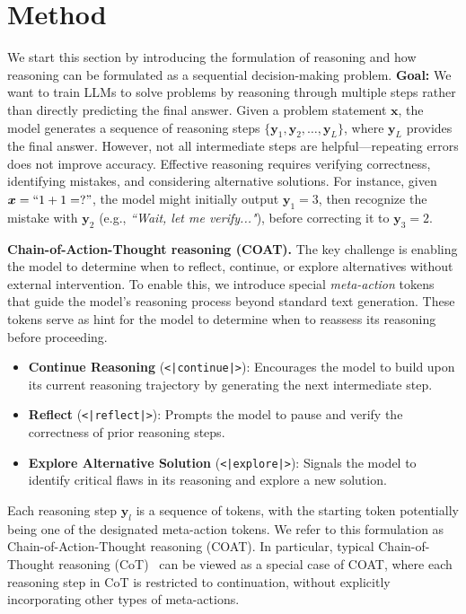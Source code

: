 \section{Method} \label{sec:method} 

We start this section by introducing the formulation of reasoning and how reasoning can be formulated as a sequential decision-making problem.
\textbf{Goal:}
We want to train LLMs to solve problems by reasoning through multiple steps rather than directly predicting the final answer. Given a problem statement \(\boldsymbol{x}\), the model generates a sequence of reasoning steps \(\{\boldsymbol{y}_1, \boldsymbol{y}_2, \dots, \boldsymbol{y}_L\}\), where \(\boldsymbol{y}_L\) provides the final answer. However, not all intermediate steps are helpful—repeating errors does not improve accuracy. Effective reasoning requires verifying correctness, identifying mistakes, and considering alternative solutions.
For instance, given \(\boldsymbol{x} = ``1+1=?"\), the model might initially output \(\boldsymbol{y}_1 = 3\), then recognize the mistake with \(\boldsymbol{y}_2\) (e.g., \textit{``Wait, let me verify..."}), before correcting it to \(\boldsymbol{y}_3 = 2\). 

\textbf{Chain-of-Action-Thought reasoning (COAT).} The key challenge is enabling the model to determine when to reflect, continue, or explore alternatives without external intervention. To enable this, we introduce special \textit{meta-action} tokens that guide the model’s reasoning process beyond standard text generation. These tokens serve as hint for the model to determine when to reassess its reasoning before proceeding.
\begin{itemize}[leftmargin=*]
    \item \textbf{Continue Reasoning} (\texttt{<|continue|>}): Encourages the model to build upon its current reasoning trajectory by generating the next intermediate step.
    \item \textbf{Reflect} (\texttt{<|reflect|>}): Prompts the model to pause and verify the correctness of prior reasoning steps.
    \item \textbf{Explore Alternative Solution} (\texttt{<|explore|>}): Signals the model to identify critical flaws in its reasoning and explore a new solution.
\end{itemize}
Each reasoning step \(\boldsymbol{y}_l\) is a sequence of tokens, with the starting token potentially being one of the designated meta-action tokens. We refer to this formulation as Chain-of-Action-Thought reasoning (COAT). In particular, typical Chain-of-Thought reasoning (CoT)~\cite{wei2022chain} can be viewed as a special case of COAT, where each reasoning step in CoT is restricted to continuation, without explicitly incorporating other types of meta-actions.


